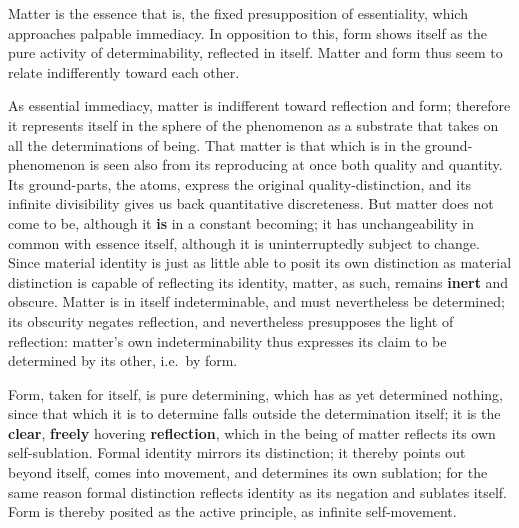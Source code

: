 \documentclass[12pt,a4paper,openany]{book}
\newcommand{\opage}[1]{\marginnote{\footnotesize\textit{[#1]}}}
\begin{document}
Matter is the essence that is, the fixed presupposition
of essentiality, which approaches palpable
immediacy. In opposition to this, form shows itself
as the pure activity of determinability, reflected in itself.
Matter and form thus seem to relate indifferently
toward each other.

As essential immediacy, matter is indifferent
toward reflection and form; therefore it represents
itself in the sphere of the phenomenon as a substrate that takes on
all the determinations of being.
\setcounter{footnote}{0}%
\opage{145}That matter is that which is in the ground-phenomenon
is seen also from its reproducing at once both quality and quantity. Its ground-parts,
the atoms, express the original quality-distinction, and
its infinite divisibility gives us back quantitative
discreteness. But matter does not come to be, although it \textbf{is}
in a constant becoming; it has unchangeability in common
with essence itself, although it is uninterruptedly subject
to change. Since material identity is just as
little able to posit its own distinction as
material distinction is capable of reflecting its identity,
matter, as such, remains \textbf{inert} and
obscure. Matter is in itself indeterminable, and must
nevertheless be determined; its obscurity negates reflection,
and nevertheless presupposes the light of reflection: matter's own
indeterminability thus expresses its claim to
be determined by its other, i.e.\ by form.

Form, taken for itself, is pure determining, which
has as yet determined nothing, since that which it is to determine
falls outside the determination itself; it is the \textbf{clear},
\textbf{freely} hovering \textbf{reflection}, which in the being of matter
reflects its own self-sublation. Formal identity
mirrors its distinction; it thereby points out beyond
itself, comes into movement, and determines its own
sublation; for the same reason formal
distinction reflects identity as its negation and sublates
itself. Form is thereby posited as the active principle,
as infinite self-movement.
\end{document}
